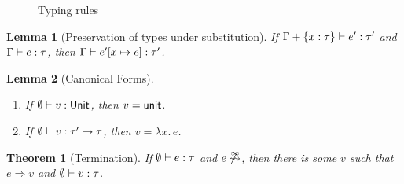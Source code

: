 \documentclass[12pt,a2paper,draft]{article}
\newcommand{\abstr}[2]{\ensuremath{\lambda{#1}.\,{#2}}}
\newcommand{\app}[2]{\ensuremath{{#1}\,{#2}}}
\newcommand{\rec}[2]{\ensuremath{{\normalfont\textsf{rec}}\,{#1}.\,{#2}}}
\newcommand{\unit}{\ensuremath{\normalfont\textsf{unit}}}
\newcommand{\Unit}{\ensuremath{\normalfont\textsf{Unit}}}
\newcommand{\Tj}[3]{\mbox{\ensuremath{{#1}\vdash{#2}:{#3}}}}
\newcommand{\tj}[2]{\Tj{\emptyset}{#1}{#2}}
\newtheorem{lemma}{Lemma}
\newtheorem{theorem}{Theorem}
\begin{document}
\begin{figure}[htb]
  \centering
  \caption{Typing rules}
  \label{figure:Typing_rules}
\end{figure}

\begin{lemma}[Preservation of types under substitution] \label{lemma:Preservation_of_types_under_substitution}
  If $\Tj{\Gamma + \{x:\tau\}}{e'}{\tau'}$ and $\Tj{\Gamma}{e}{\tau}$,
  then $\Tj{\Gamma}{e'[x \mapsto e]}{\tau'}$.
\end{lemma}

\begin{lemma}[Canonical Forms] \label{lemma:Canonical_Forms} \
  \begin{enumerate}
  \item If $\tj{v}{\Unit}$, then $v = \unit$.
  \item If $\tj{v}{\tau' \to \tau}$, then $v = \abstr{x}{e}$.
  \end{enumerate}
\end{lemma}

\begin{theorem}[Termination]
  If $\tj{e}{\tau}$ and $e \not\stackrel{\infty}{\leadsto}$, then there is some
  $v$ such that $e \Rightarrow v$ and $\tj{v}{\tau}$.
\end{theorem}
\end{document}
